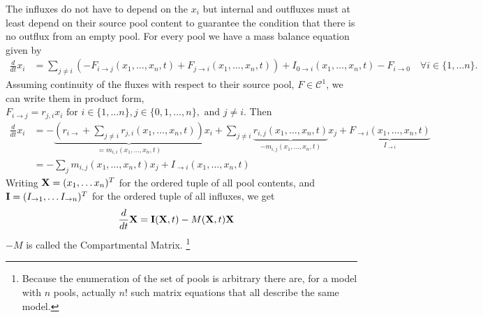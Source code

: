 The influxes do not have to depend on the $x_i$  but internal and outfluxes must at least depend  on their source pool content to guarantee the 
condition that there is no outflux from an empty pool. 
\newcommand{\xnt}{(x_1, \dots, x_n, t)}
For every pool we have a mass balance equation given by
\begin{align}
  \frac{d}{d t} x_i 
    &= 
    \sum_{j\ne i} (-F_{i\rightarrow j}\xnt
    +F_{j\rightarrow i}\xnt ) 
    + I_{0 \rightarrow i}\xnt 
    - F_{i \rightarrow 0} \quad \forall i \in \{1,\dots n\}.
\end{align}
Assuming continuity of the fluxes with respect to their source pool, 
$F \in \mathcal C^1$,  we can write them in product form,
$F_{i \rightarrow j} = r_{j,i} x_i \text{ for } i \in \{1, \dots n\} , j \in \{ 0, 1,\dots ,n\}, \text{ and } j \ne i $. Then
\begin{align}
  \frac{d}{d t} x_i 
    &= - \underbrace{
      \left(
      r_{i \rightarrow } 
      + 
      \sum_{j \ne i} r_{j,i}\xnt
      \right)
      }_{=m_{i,i}\xnt}
      x_i
      +
      \sum_{j \ne i} \underbrace{r_{i,j}\xnt}_{- m_{i,j} \xnt } x_j
      +
      \underbrace{F_{\rightarrow i}\xnt}_{I_{\rightarrow i}}
    \\
    &= 
      -\sum_{j} m_{i,j}\xnt x_j + I_{\rightarrow i}\xnt
\end{align}
Writing 
$\mathbf{X}=(x_1,\dots x_n)^T$ for the ordered tuple of all pool contents, and $\mathbf{I}=(I_{\rightarrow 1},\dots I_{\rightarrow n})^T$ for the ordered tuple of all influxes, we get
\begin{align}
  \frac{d}{d t} \mathbf{X} &= \mathbf{I}(\mathbf{X},t) - M(\mathbf{X},t) \mathbf{X} \label{massbalance_0}
\end{align}
$-M$ is called the Compartmental Matrix. \footnote{Because the enumeration of the set of pools is arbitrary there are, for a model with $n$ pools, actually $n!$ such matrix equations that all describe the same model.} 

